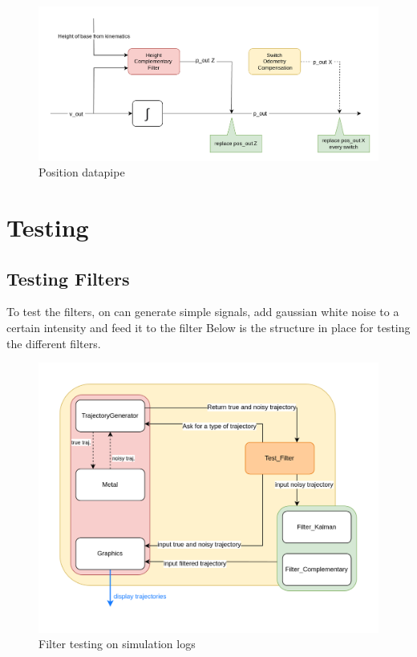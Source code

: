 \documentclass[a4paper,10pt]{article}
\begin{document}
\begin{figure}[H]
\centering
  \includegraphics[width=\linewidth, angle=0, scale=0.7]{./images/Variable_Position.png}
  \caption{Position datapipe}
\end{figure}






\section{Testing}
\subsection{Testing Filters}
To test the filters, on can generate simple signals, add gaussian white noise to a certain intensity and feed it to the filter
Below is the structure in place for testing the different filters.
\begin{figure}[H]
\centering
  \includegraphics[width=\linewidth, angle=0, scale=0.9]{./images/Action_Test.png}
  \caption{Filter testing on simulation logs}
\end{figure}
\end{document}
